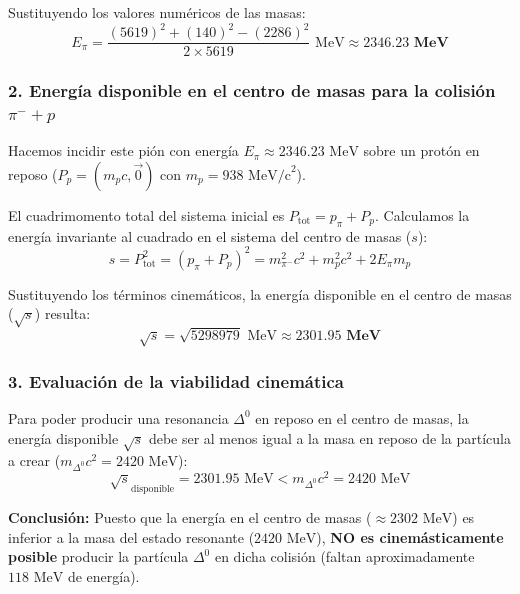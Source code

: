 \begin{problema}
Sustituyendo los valores numéricos de las masas:
\begin{equation*}
E_\pi = \frac{(5619)^2 + (140)^2 - (2286)^2}{2 \times 5619}\text{ MeV} \approx \mathbf{2346.23\text{ MeV}}
\end{equation*}

\subsubsection*{2. Energía disponible en el centro de masas para la colisión $\pi^- + p$}

Hacemos incidir este pión con energía $E_\pi \approx 2346.23\text{ MeV}$ sobre un protón en reposo ($P_p = (m_p c, \vec{0})$ con $m_p = 938\text{ MeV/c}^2$). 

El cuadrimomento total del sistema inicial es $P_{\text{tot}} = p_\pi + P_p$. Calculamos la energía invariante al cuadrado en el sistema del centro de masas ($s$):
\begin{equation*}
s = P_{\text{tot}}^2 = (p_\pi + P_p)^2 = m_{\pi^-}^2 c^2 + m_p^2 c^2 + 2 E_\pi m_p
\end{equation*}

Sustituyendo los términos cinemáticos, la energía disponible en el centro de masas ($\sqrt{s}$) resulta:
\begin{equation*}
\sqrt{s} = \sqrt{5298979}\text{ MeV} \approx \mathbf{2301.95\text{ MeV}}
\end{equation*}

\subsubsection*{3. Evaluación de la viabilidad cinemática}

Para poder producir una resonancia $\Delta^0$ en reposo en el centro de masas, la energía disponible $\sqrt{s}$ debe ser al menos igual a la masa en reposo de la partícula a crear ($m_{\Delta^0} c^2 = 2420\text{ MeV}$):
\begin{equation*}
\sqrt{s}_{\text{disponible}} = 2301.95\text{ MeV} < m_{\Delta^0} c^2 = 2420\text{ MeV}
\end{equation*}

\textbf{Conclusión:} Puesto que la energía en el centro de masas ($\approx 2302\text{ MeV}$) es inferior a la masa del estado resonante ($2420\text{ MeV}$), \textbf{NO es cinemásticamente posible} producir la partícula $\Delta^0$ en dicha colisión (faltan aproximadamente $118\text{ MeV}$ de energía).
\end{problema}


